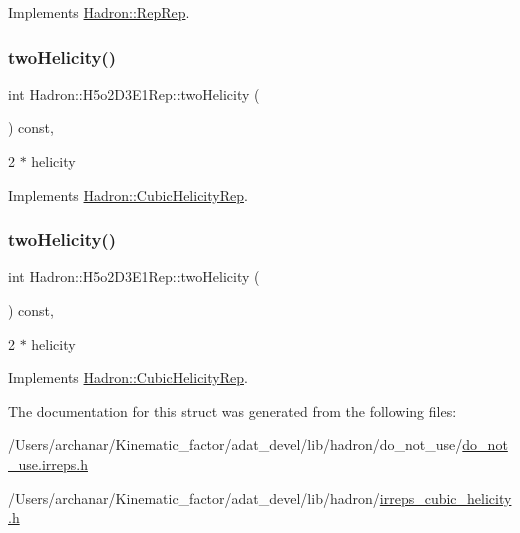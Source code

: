 Implements \mbox{\hyperlink{structHadron_1_1RepRep_ab3213025f6de249f7095892109575fde}{Hadron\+::\+Rep\+Rep}}.

\mbox{\label{structHadron_1_1H5o2D3E1Rep_a27a2e169bad892e46433717d73c2a9ed}} 
\subsubsection{\texorpdfstring{twoHelicity()}{twoHelicity()}\hspace{0.1cm}{\footnotesize\ttfamily [1/2]}}
{\footnotesize\ttfamily int Hadron\+::\+H5o2\+D3\+E1\+Rep\+::two\+Helicity (\begin{DoxyParamCaption}{ }\end{DoxyParamCaption}) const\hspace{0.3cm}{\ttfamily [inline]}, {\ttfamily [virtual]}}

2 $\ast$ helicity 

Implements \mbox{\hyperlink{structHadron_1_1CubicHelicityRep_af507aa56fc2747eacc8cb6c96db31ecc}{Hadron\+::\+Cubic\+Helicity\+Rep}}.

\mbox{\label{structHadron_1_1H5o2D3E1Rep_a27a2e169bad892e46433717d73c2a9ed}} 
\subsubsection{\texorpdfstring{twoHelicity()}{twoHelicity()}\hspace{0.1cm}{\footnotesize\ttfamily [2/2]}}
{\footnotesize\ttfamily int Hadron\+::\+H5o2\+D3\+E1\+Rep\+::two\+Helicity (\begin{DoxyParamCaption}{ }\end{DoxyParamCaption}) const\hspace{0.3cm}{\ttfamily [inline]}, {\ttfamily [virtual]}}

2 $\ast$ helicity 

Implements \mbox{\hyperlink{structHadron_1_1CubicHelicityRep_af507aa56fc2747eacc8cb6c96db31ecc}{Hadron\+::\+Cubic\+Helicity\+Rep}}.



The documentation for this struct was generated from the following files\+:\begin{DoxyCompactItemize}
\item 
/\+Users/archanar/\+Kinematic\+\_\+factor/adat\+\_\+devel/lib/hadron/do\+\_\+not\+\_\+use/\mbox{\hyperlink{do__not__use_8irreps_8h}{do\+\_\+not\+\_\+use.\+irreps.\+h}}\item 
/\+Users/archanar/\+Kinematic\+\_\+factor/adat\+\_\+devel/lib/hadron/\mbox{\hyperlink{lib_2hadron_2irreps__cubic__helicity_8h}{irreps\+\_\+cubic\+\_\+helicity.\+h}}\end{DoxyCompactItemize}
